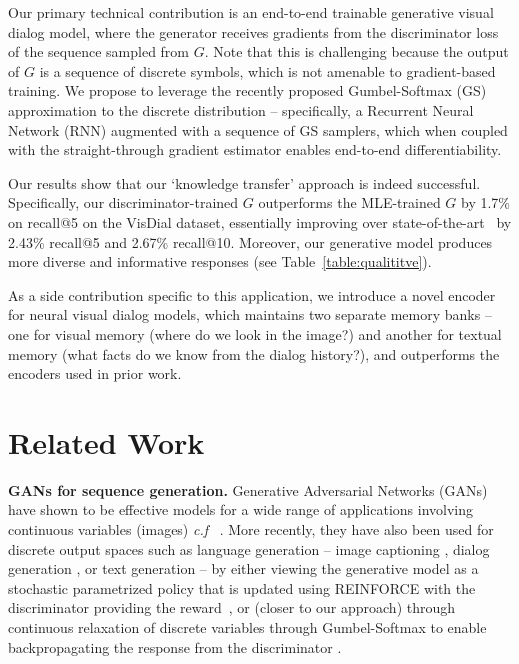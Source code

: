 \documentclass{article}
\begin{document}
Our primary technical contribution is an end-to-end trainable generative visual dialog model, 
where the generator receives gradients from the discriminator loss of the sequence sampled from $G$. 
Note that this is challenging because the output of $G$ is a sequence of discrete symbols, which \naively is not amenable to gradient-based training. 
We propose to leverage the recently proposed Gumbel-Softmax (GS) approximation to the discrete distribution \cite{jang2016categorical, maddison2016concrete} -- 
specifically, a Recurrent Neural Network (RNN) augmented with a sequence of GS samplers, which when coupled with the straight-through gradient estimator 
\cite{BengioLC13, jang2016categorical} enables end-to-end differentiability. 



Our results show that our `knowledge transfer' approach is indeed successful. Specifically, our discriminator-trained 
$G$ outperforms the MLE-trained $G$ by 1.7\% on recall@5 on the VisDial dataset, essentially improving over state-of-the-art~\cite{visdial} by 2.43\% recall@5 and 2.67\% recall@10. Moreover, our generative model produces more diverse and informative responses (see Table~\ref{table:qualititve}). 

As a side contribution specific to this application, we introduce a novel encoder 
for neural visual dialog models, which maintains two 
separate memory banks -- one for visual memory (where do we look in the image?) and another 
for textual memory (what facts do we know from the dialog history?), and outperforms the encoders used in prior work. 


 \section{Related Work}
\label{sec:related}



{\bf GANs for sequence generation.}
Generative Adversarial Networks (GANs) \cite{goodfellow2014generative} have shown to be effective models for a wide range of 
applications involving continuous variables (\eg images) {\it c.f} ~\cite{DentonCSF15,dcgan,LedigTHCATTWS16,CycleGAN2017}. 
More recently, they have also been used for discrete
output spaces such as language generation -- \eg image 
captioning \cite{dai2017towards,ShettyRHFS17}, dialog generation 
 \cite{li2017adversarial}, or text generation \cite{yu2017seqgan} -- by either viewing the generative model 
as a stochastic parametrized policy that is updated using REINFORCE with the discriminator providing 
the reward~\cite{yu2017seqgan,dai2017towards,ShettyRHFS17,li2017adversarial}, or (closer to our approach) through continuous
relaxation of discrete variables through Gumbel-Softmax to enable backpropagating the response from 
the discriminator \cite{Kusner16, ShettyRHFS17}.
\end{document}
